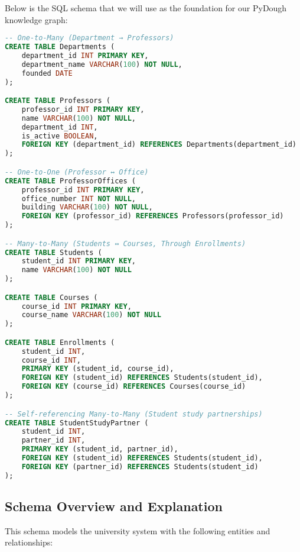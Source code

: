 \documentclass{article}
\begin{document}
Below is the SQL schema that we will use as the foundation for our PyDough knowledge graph:

\begin{lstlisting}[language=SQL, caption={University Database Schema}]
-- One-to-Many (Department → Professors)
CREATE TABLE Departments (
    department_id INT PRIMARY KEY,
    department_name VARCHAR(100) NOT NULL,
    founded DATE
);

CREATE TABLE Professors (
    professor_id INT PRIMARY KEY,
    name VARCHAR(100) NOT NULL,
    department_id INT,
    is_active BOOLEAN,
    FOREIGN KEY (department_id) REFERENCES Departments(department_id)
);

-- One-to-One (Professor ↔ Office)
CREATE TABLE ProfessorOffices (
    professor_id INT PRIMARY KEY,
    office_number INT NOT NULL,
    building VARCHAR(100) NOT NULL,
    FOREIGN KEY (professor_id) REFERENCES Professors(professor_id)
);

-- Many-to-Many (Students ↔ Courses, Through Enrollments)
CREATE TABLE Students (
    student_id INT PRIMARY KEY,
    name VARCHAR(100) NOT NULL
);

CREATE TABLE Courses (
    course_id INT PRIMARY KEY,
    course_name VARCHAR(100) NOT NULL
);

CREATE TABLE Enrollments (
    student_id INT,
    course_id INT,
    PRIMARY KEY (student_id, course_id),
    FOREIGN KEY (student_id) REFERENCES Students(student_id),
    FOREIGN KEY (course_id) REFERENCES Courses(course_id)
);

-- Self-referencing Many-to-Many (Student study partnerships)
CREATE TABLE StudentStudyPartner (
    student_id INT,
    partner_id INT,
    PRIMARY KEY (student_id, partner_id),
    FOREIGN KEY (student_id) REFERENCES Students(student_id),
    FOREIGN KEY (partner_id) REFERENCES Students(student_id)
);
\end{lstlisting}

\subsection{Schema Overview and Explanation}

This schema models the university system with the following entities and relationships:
\end{document}
